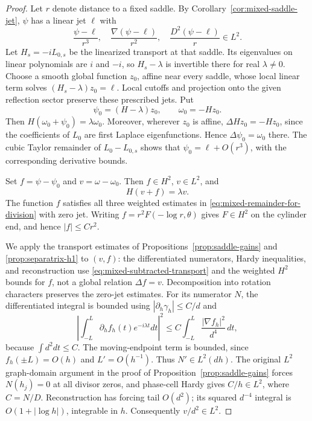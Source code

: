 \documentclass[reqno,11pt]{amsart}
\numberwithin{equation}{section}
\theoremstyle{remark}
\begin{document}
\begin{proof}
Let $r$ denote distance to a fixed saddle. By
Corollary~\ref{cor:mixed-saddle-jet}, $\psi$ has a linear jet $\ell$
with
\begin{equation}
 \frac{\psi-\ell}{r^3},\quad
 \frac{\nabla(\psi-\ell)}{r^2},\quad
 \frac{D^2(\psi-\ell)}r\in L^2.
 \label{eq:mixed-remainder-for-division}
\end{equation}
Let $H_s=-iL_{0,s}$ be the linearized transport at that saddle.
Its eigenvalues on linear polynomials are $i$ and $-i$, so
$H_s-\lambda$ is invertible there for real $\lambda\ne0$.
Choose a smooth global function $z_0$, affine near every saddle,
whose local linear term solves $(H_s-\lambda)z_0=\ell$.
Local cutoffs and projection onto the given reflection sector
preserve these prescribed jets.  Put
\[
 \psi_0=(H-\lambda)z_0,\qquad \omega_0=-Hz_0.
\]
Then $H(\omega_0+\psi_0)=\lambda\omega_0$.
Moreover, wherever $z_0$ is affine,
$\Delta Hz_0=-Hz_0$, since the coefficients of $L_0$ are first
Laplace eigenfunctions.  Hence $\Delta\psi_0=\omega_0$ there.
The cubic Taylor remainder of $L_0-L_{0,s}$ shows that
$\psi_0=\ell+O(r^3)$, with the corresponding derivative bounds.

Set $f=\psi-\psi_0$ and $v=\omega-\omega_0$.
Then $f\in H^2$, $v\in L^2$, and
\begin{equation}
 H(v+f)=\lambda v.
 \label{eq:mixed-subtracted-transport}
\end{equation}
The function $f$ satisfies all three weighted estimates in
\eqref{eq:mixed-remainder-for-division} with zero jet.
Writing $f=r^2F(-\log r,\theta)$ gives $F\in H^2$ on the
cylinder end, and hence $|f|\leq Cr^2$.

We apply the transport estimates of
Propositions~\ref{prop:saddle-gains} and
\ref{prop:separatrix-h1} to $(v,f)$: the differentiated numerators,
Hardy inequalities, and reconstruction use
\eqref{eq:mixed-subtracted-transport} and the weighted $H^2$ bounds
for $f$, not a global relation $\Delta f=v$. Decomposition into
rotation characters preserves the zero-jet estimates.
For its numerator $N$, the differentiated integral is bounded
using $|\partial_h\gamma_h|\leq C/d$ and
\[
 \left|\int_{-L}^L\partial_hf_h(t)e^{-i\lambda t}dt\right|^2
 \leq C\int_{-L}^L\frac{|\nabla f_h|^2}{d^4}\,dt,
\]
because $\int d^2dt\leq C$.  The moving-endpoint term is bounded,
since $f_h(\pm L)=O(h)$ and $L'=O(h^{-1})$.
Thus $N'\in L^2(dh)$.  The original $L^2$ graph-domain argument
in the proof of Proposition~\ref{prop:saddle-gains}
forces $N(h_j)=0$ at all divisor zeros, and phase-cell Hardy gives
$C/h\in L^2$, where $C=N/D$.
Reconstruction has forcing tail $O(d^2)$; its squared
$d^{-4}$ integral is $O(1+|\log h|)$, integrable in $h$.
Consequently $v/d^2\in L^2$.


\end{proof}
\end{document}
